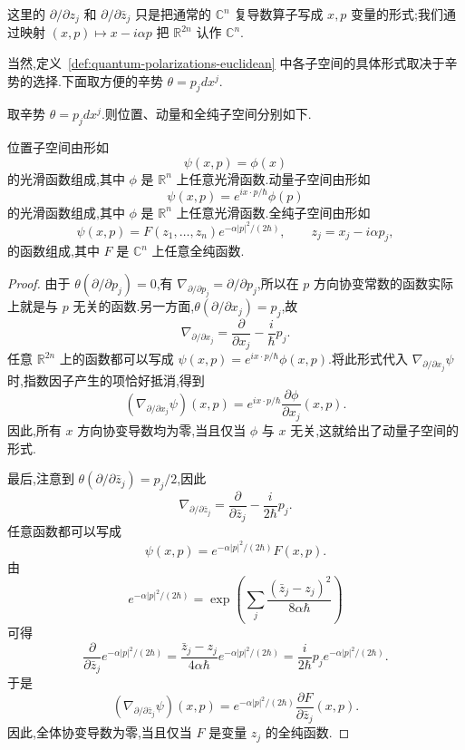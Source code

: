 这里的 $\partial/\partial z_j$ 和 $\partial/\partial\bar z_j$ 只是把通常的 $\mathbb C^n$ 复导数算子写成 $x,p$ 变量的形式;我们通过映射 $(x,p)\mapsto x-i\alpha p$ 把 $\mathbb R^{2n}$ 认作 $\mathbb C^n$.

当然,定义~\ref{def:quantum-polarizations-euclidean} 中各子空间的具体形式取决于辛势的选择.下面取方便的辛势 $\theta=p_jdx^j$.

\begin{proposition}[三个子空间的具体形式]
\label{prop:quantum-polarization-functions}
取辛势 $\theta=p_jdx^j$.则位置、动量和全纯子空间分别如下.

位置子空间由形如
\[
 \psi(x,p)=\phi(x)
\]
的光滑函数组成,其中 $\phi$ 是 $\mathbb R^n$ 上任意光滑函数.动量子空间由形如
\[
 \psi(x,p)=e^{ix\cdot p/\hbar}\phi(p)
 \label{eq:momentum-polarized-function}
\]
的光滑函数组成,其中 $\phi$ 是 $\mathbb R^n$ 上任意光滑函数.全纯子空间由形如
\[
 \psi(x,p)=F(z_1,\ldots,z_n)e^{-\alpha|p|^2/(2\hbar)},
 \qquad z_j=x_j-i\alpha p_j,
 \label{eq:holomorphic-polarized-function}
\]
的函数组成,其中 $F$ 是 $\mathbb C^n$ 上任意全纯函数.
\end{proposition}

\begin{proof}
由于 $\theta(\partial/\partial p_j)=0$,有
$\nabla_{\partial/\partial p_j}=\partial/\partial p_j$,所以在 $p$ 方向协变常数的函数实际上就是与 $p$ 无关的函数.另一方面,$\theta(\partial/\partial x_j)=p_j$,故
\[
 \nabla_{\partial/\partial x_j}
 =\frac{\partial}{\partial x_j}-\frac{i}{\hbar}p_j.
\]
任意 $\mathbb R^{2n}$ 上的函数都可以写成
$\psi(x,p)=e^{ix\cdot p/\hbar}\phi(x,p)$.将此形式代入
$\nabla_{\partial/\partial x_j}\psi$ 时,指数因子产生的项恰好抵消,得到
\[
 \left(\nabla_{\partial/\partial x_j}\psi\right)(x,p)
 =e^{ix\cdot p/\hbar}\frac{\partial\phi}{\partial x_j}(x,p).
\]
因此,所有 $x$ 方向协变导数均为零,当且仅当 $\phi$ 与 $x$ 无关,这就给出了动量子空间的形式.

最后,注意到 $\theta(\partial/\partial\bar z_j)=p_j/2$,因此
\[
 \nabla_{\partial/\partial\bar z_j}
 =\frac{\partial}{\partial\bar z_j}-\frac{i}{2\hbar}p_j.
\]
任意函数都可以写成
\[
 \psi(x,p)=e^{-\alpha|p|^2/(2\hbar)}F(x,p).
\]
由
\[
 e^{-\alpha|p|^2/(2\hbar)}
 =\exp\left(\sum_j\frac{(\bar z_j-z_j)^2}{8\alpha\hbar}\right)
\]
可得
\[
 \frac{\partial}{\partial\bar z_j}e^{-\alpha|p|^2/(2\hbar)}
 =\frac{\bar z_j-z_j}{4\alpha\hbar}e^{-\alpha|p|^2/(2\hbar)}
 =\frac{i}{2\hbar}p_j e^{-\alpha|p|^2/(2\hbar)}.
\]
于是
\[
 \left(\nabla_{\partial/\partial\bar z_j}\psi\right)(x,p)
 =e^{-\alpha|p|^2/(2\hbar)}
 \frac{\partial F}{\partial\bar z_j}(x,p).
\]
因此,全体协变导数为零,当且仅当 $F$ 是变量 $z_j$ 的全纯函数.
\end{proof}

